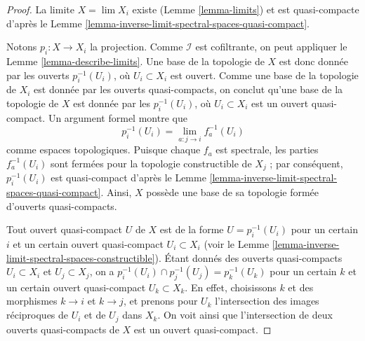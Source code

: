 \begin{proof}
La limite $X = \lim X_i$ existe (Lemme \ref{lemma-limits})
et est quasi-compacte d'après le
Lemme \ref{lemma-inverse-limit-spectral-spaces-quasi-compact}.

\medskip\noindent
Notons $p_i : X \to X_i$ la projection.
Comme $\mathcal{I}$ est cofiltrante, on peut appliquer le
Lemme \ref{lemma-describe-limits}.
Une base de la topologie de $X$ est donc donnée par les ouverts
$p_i^{-1}(U_i)$, où $U_i \subset X_i$ est ouvert. Comme une base de
la topologie de $X_i$ est donnée par les ouverts quasi-compacts, on conclut
qu'une base de la topologie de $X$ est donnée par les $p_i^{-1}(U_i)$,
où $U_i \subset X_i$ est un ouvert quasi-compact. Un argument formel
montre que
$$
p_i^{-1}(U_i) = \lim_{a : j \to i} f_a^{-1}(U_i)
$$
comme espaces topologiques. Puisque chaque $f_a$ est spectrale, les parties
$f_a^{-1}(U_i)$ sont fermées pour la topologie constructible de $X_j$ ;
par conséquent, $p_i^{-1}(U_i)$ est quasi-compact d'après le
Lemme \ref{lemma-inverse-limit-spectral-spaces-quasi-compact}.
Ainsi, $X$ possède une base de sa topologie formée d'ouverts quasi-compacts.

\medskip\noindent
Tout ouvert quasi-compact $U$ de $X$ est de la forme $U = p_i^{-1}(U_i)$
pour un certain $i$ et un certain ouvert quasi-compact $U_i \subset X_i$
(voir le Lemme \ref{lemma-inverse-limit-spectral-spaces-constructible}).
Étant donnés des ouverts quasi-compacts $U_i \subset X_i$ et
$U_j \subset X_j$, on a
$p_i^{-1}(U_i) \cap p_j^{-1}(U_j) = p_k^{-1}(U_k)$ pour un certain $k$
et un certain ouvert quasi-compact $U_k \subset X_k$. En effet, choisissons
$k$ et des morphismes $k \to i$ et $k \to j$, et prenons pour $U_k$
l'intersection des images réciproques de $U_i$ et de $U_j$ dans $X_k$.
On voit ainsi que l'intersection de deux ouverts quasi-compacts de $X$ est
un ouvert quasi-compact.


\end{proof}
